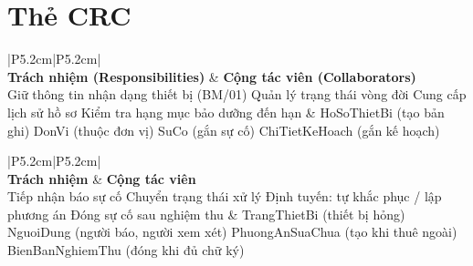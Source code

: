\section{Thẻ CRC}

\begin{table}[h]
\centering
\begin{tabular}{|P{5.2cm}|P{5.2cm}|}
\hline
{} \\
\hline
\textbf{Trách nhiệm (Responsibilities)} & \textbf{Cộng tác viên (Collaborators)} \\
\hline
Giữ thông tin nhận dạng thiết bị (BM/01) \newline Quản lý trạng thái vòng đời \newline Cung cấp lịch sử hồ sơ \newline Kiểm tra hạng mục bảo dưỡng đến hạn & HoSoThietBi (tạo bản ghi) \newline DonVi (thuộc đơn vị) \newline SuCo (gắn sự cố) \newline ChiTietKeHoach (gắn kế hoạch) \\
\hline
\end{tabular}
\end{table}

\begin{table}[h]
\centering
\begin{tabular}{|P{5.2cm}|P{5.2cm}|}
\hline
{} \\
\hline
\textbf{Trách nhiệm} & \textbf{Cộng tác viên} \\
\hline
Tiếp nhận báo sự cố \newline Chuyển trạng thái xử lý \newline Định tuyến: tự khắc phục / lập phương án \newline Đóng sự cố sau nghiệm thu & TrangThietBi (thiết bị hỏng) \newline NguoiDung (người báo, người xem xét) \newline PhuongAnSuaChua (tạo khi thuê ngoài) \newline BienBanNghiemThu (đóng khi đủ chữ ký) \\
\hline
\end{tabular}
\end{table}

